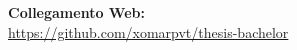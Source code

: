 \noindent
\begin{minipage}{0.7\textwidth}
    \textbf{Collegamento Web:} \\
    \url{https://github.com/xomarpvt/thesis-bachelor}
    
    \vspace{0.3cm}
\end{minipage}
\begin{minipage}{0.3\textwidth}
    \begin{center}
         \\
        \vspace{0.1cm}
    \end{center}
\end{minipage}